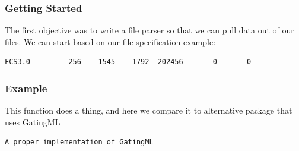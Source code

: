 \documentclass{beamer}
\begin{document}
\begin{frame}[fragile]
  \frametitle{Getting Started} The first objective was to write a file
  parser so that we can pull data out of our files. We can start based
  on our file specification\cite{spidlen2021data} example:
\begin{lstlisting}
FCS3.0         256    1545    1792  202456       0       0 
\end{lstlisting}
\end{frame}

\begin{frame}[fragile]
  \frametitle{Example}
  This function does a thing, and here we compare it to alternative package that uses GatingML
\begin{lstlisting}
A proper implementation of GatingML
    \end{lstlisting}
\end{frame}

\nocite{*}


\end{document}
